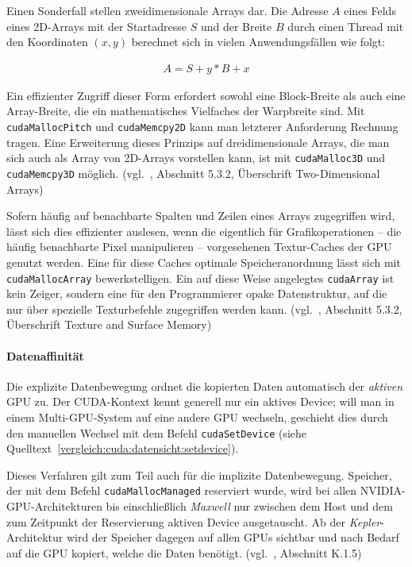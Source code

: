 Einen Sonderfall stellen zweidimensionale Arrays dar. Die Adresse $A$ eines
Felds eines 2D-Arrays mit der Startadresse $S$ und der Breite $B$ durch einen
Thread mit den Koordinaten $(x, y)$ berechnet sich in vielen Anwendungsfällen
wie folgt:

\begin{align*}
    A = S + y * B + x
\end{align*}

Ein effizienter Zugriff dieser Form erfordert sowohl eine Block-Breite als auch
eine Array-Breite, die ein mathematisches Vielfaches der Warpbreite sind. Mit
\texttt{cudaMallocPitch} und \texttt{cudaMemcpy2D} kann man
letzterer Anforderung Rechnung tragen. Eine Erweiterung dieses Prinzips auf
dreidimensionale Arrays, die man sich auch als Array von 2D-Arrays vorstellen
kann, ist mit \texttt{cudaMalloc3D} und \texttt{cudaMemcpy3D}
möglich. (vgl.~\cite{cudaguide}, Abschnitt 5.3.2, Überschrift \glqq
Two-Dimensional Arrays\grqq)

Sofern häufig auf benachbarte Spalten und Zeilen eines Arrays zugegriffen
wird, lässt sich dies effizienter auslesen, wenn die eigentlich für
Grafikoperationen -- die häufig benachbarte Pixel manipulieren -- vorgesehenen
Textur-Caches der GPU genutzt werden. Eine für diese Caches optimale
Speicheranordnung lässt sich mit \texttt{cudaMallocArray}
bewerkstelligen. Ein auf diese Weise angelegtes \texttt{cudaArray} ist
kein Zeiger, sondern eine für den Programmierer opake Datenstruktur, auf die
nur über spezielle Texturbefehle zugegriffen werden kann.
(vgl.~\cite{cudaguide}, Abschnitt 5.3.2, Überschrift \glqq Texture and Surface
Memory\grqq)

\paragraph{Datenaffinität}

Die explizite Datenbewegung ordnet die kopierten Daten automatisch der
\textit{aktiven} GPU zu. Der CUDA-Kontext kennt generell nur ein aktives Device;
will man in einem Multi-GPU-System auf eine andere GPU wechseln, geschieht dies
durch den manuellen Wechsel mit dem Befehl \texttt{cudaSetDevice} (siehe
Quelltext~\ref{vergleich:cuda:datensicht:setdevice}).

Dieses Verfahren gilt zum Teil auch für die implizite Datenbewegung. Speicher,
der mit dem Befehl \texttt{cudaMallocManaged} reserviert wurde, wird bei allen
NVIDIA-GPU-Architekturen bis einschließlich \textit{Maxwell} nur zwischen dem
Host und dem zum Zeitpunkt der Reservierung aktiven Device ausgetauscht. Ab der
\textit{Kepler}-Architektur wird der Speicher dagegen auf allen GPUs sichtbar
und nach Bedarf auf die GPU kopiert, welche die Daten benötigt.
(vgl.~\cite{cudaguide}, Abschnitt K.1.5)

